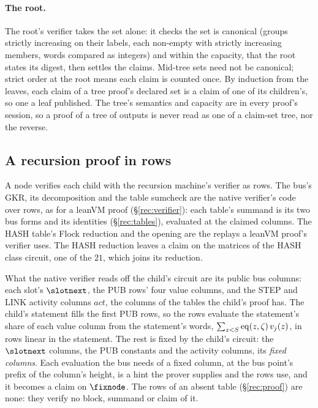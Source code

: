 \paragraph{The root.} The root's verifier takes the set alone: it checks the set is canonical (groups strictly increasing on their labels, each non-empty with strictly increasing members, words compared as integers) and within the capacity, that the root states its digest, then settles the claims. Mid-tree sets need not be canonical; strict order at the root means each claim is counted once. By induction from the leaves, each claim of a tree proof's declared set is a claim of one of its children's, so one a leaf published. The tree's semantics and capacity are in every proof's session, so a proof of a tree of outputs is never read as one of a claim-set tree, nor the reverse.

\subsection{A recursion proof in rows}\label{rec:child}

A node verifies each child with the recursion machine's verifier as rows. The bus's GKR, its decomposition and the table sumcheck are the native verifier's code over rows, as for a leanVM proof (\S\ref{rec:verifier}): each table's summand is its two bus forms and its identities (\S\ref{rec:tables}), evaluated at the claimed columns. The \textsf{HASH} table's Flock reduction and the opening are the replays a leanVM proof's verifier uses. The \textsf{HASH} reduction leaves a claim on the matrices of the \textsf{HASH} class circuit, one of the $21$, which joins its reduction.

What the native verifier reads off the child's circuit are its public bus columns: each slot's $\slotnext$, the \textsf{PUB} rows' four value columns, and the \textsf{STEP} and \textsf{LINK} activity columns $\mathit{act}$, the columns of the tables the child's proof has. The child's statement fills the first \textsf{PUB} rows, so the rows evaluate the statement's share of each value column from the statement's words, $\sum_{z<S}\operatorname{eq}(z,\zeta)\,v_j(z)$, in rows linear in the statement. The rest is fixed by the child's circuit: the $\slotnext$ columns, the \textsf{PUB} constants and the activity columns, its \emph{fixed columns}. Each evaluation the bus needs of a fixed column, at the bus point's prefix of the column's height, is a hint the prover supplies and the rows use, and it becomes a claim on $\fixnode$. The rows of an absent table (\S\ref{rec:proof}) are none: they verify no block, summand or claim of it.

